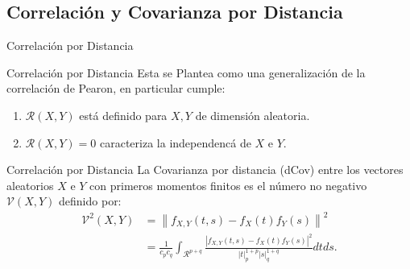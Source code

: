 \documentclass{beamer}
\begin{document}
\subsection{Correlaci\'on y Covarianza por Distancia}

\begin{frame}{Correlaci\'on por Distancia}

    \begin{block}{Correlaci\'on por Distancia}
        Esta se Plantea como una generalizaci\'on de la correlaci\'on de Pearon, en particular cumple:
        \begin{enumerate}
            \item $\mathcal{R}(X,Y)$ est\'a definido para $X,Y$ de dimensi\'on aleatoria.
            \item $\mathcal{R}(X,Y) = 0$ caracteriza la independenc\'a de $X$ e $Y$.	 
        \end{enumerate}
    \end{block}

    \begin{block}{Correlaci\'on por Distancia}
        La Covarianza por distancia (dCov) entre los vectores aleatorios $X$ e $Y$ con primeros momentos finitos es el n\'umero no negativo $\mathcal{V}(X, Y)$ definido por:
        \begin{equation}
            \begin{aligned}\label{dcov_formula}
                \mathcal{V}^2(X, Y) & =\left\|f_{X, Y}(t, s)-f_X(t) f_Y(s)\right\|^2 \\
                & =\frac{1}{c_p c_q} \int_{\mathcal{R}^{p+q}} \frac{\left|f_{X, Y}(t, s)-f_X(t) f_Y(s)\right|^2}{|t|_p^{1+p}|s|_q^{1+q}} d t d s .
                \end{aligned}
        \end{equation}
    \end{block}
\end{frame}
\end{document}
